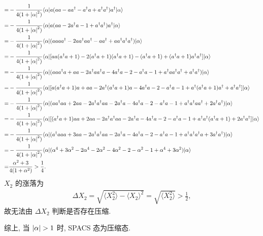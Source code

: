 \documentclass{assignment}
\begin{document}
\begin{sol}
\begin{align}
        \notag=&-\frac{1}{4(1+\left\lvert\alpha\right\rvert^2)}\langle\alpha\rvert a(aa-aa^{\dagger}-a^{\dagger}a+a^{\dagger}a^{\dagger})a^{\dagger}\lvert\alpha\rangle\\
        \notag=&-\frac{1}{4(1+\left\lvert\alpha\right\rvert^2)}\langle\alpha\rvert a(aa-2a^{\dagger}a-1+a^{\dagger}a^{\dagger})a^{\dagger}\lvert\alpha\rangle\\
        \notag=&-\frac{1}{4(1+\left\lvert\alpha\right\rvert^2)}\langle\alpha\rvert(aaaa^{\dagger}-2aa^{\dagger}aa^{\dagger}-aa^{\dagger}+aa^{\dagger}a^{\dagger}a^{\dagger})\lvert\alpha\rangle\\
        \notag=&-\frac{1}{4(1+\left\lvert\alpha\right\rvert^2)}\langle\alpha\rvert[aa(a^{\dagger}a+1)-2(a^{\dagger}a+1)(a^{\dagger}a+1)-(a^{\dagger}a+1)+(a^{\dagger}a+1)a^{\dagger}a^{\dagger}]\lvert\alpha\rangle\\
        \notag=&-\frac{1}{4(1+\left\lvert\alpha\right\rvert^2)}\langle\alpha\rvert(aaa^{\dagger}a+aa-2a^{\dagger}aa^{\dagger}a-4a^{\dagger}a-2-a^{\dagger}a-1+a^{\dagger}aa^{\dagger}a^{\dagger}+a^{\dagger}a^{\dagger})\lvert\alpha\rangle\\
        \notag=&-\frac{1}{4(1+\left\lvert\alpha\right\rvert^2)}\langle\alpha\rvert[a(a^{\dagger}a+1)a+aa-2a^{\dagger}(a^{\dagger}a+1)a-4a^{\dagger}a-2-a^{\dagger}a-1+a^{\dagger}(a^{\dagger}a+1)a^{\dagger}+a^{\dagger}a^{\dagger}]\lvert\alpha\rangle\\
        \notag=&-\frac{1}{4(1+\left\lvert\alpha\right\rvert^2)}\langle\alpha\rvert(aa^{\dagger}aa+2aa-2a^{\dagger}a^{\dagger}aa-2a^{\dagger}a-4a^{\dagger}a-2-a^{\dagger}a-1+a^{\dagger}a^{\dagger}aa^{\dagger}+2a^{\dagger}a^{\dagger})\lvert\alpha\rangle\\
        \notag=&-\frac{1}{4(1+\left\lvert\alpha\right\rvert^2)}\langle\alpha\rvert[(a^{\dagger}a+1)aa+2aa-2a^{\dagger}a^{\dagger}aa-2a^{\dagger}a-4a^{\dagger}a-2-a^{\dagger}a-1+a^{\dagger}a^{\dagger}(a^{\dagger}a+1)+2a^{\dagger}a^{\dagger}]\lvert\alpha\rangle\\
        \notag=&-\frac{1}{4(1+\left\lvert\alpha\right\rvert^2)}\langle\alpha\rvert(a^{\dagger}aaa+3aa-2a^{\dagger}a^{\dagger}aa-2a^{\dagger}a-4a^{\dagger}a-2-a^{\dagger}a-1+a^{\dagger}a^{\dagger}a^{\dagger}a+3a^{\dagger}a^{\dagger})\lvert\alpha\rangle\\
        \notag=&-\frac{1}{4(1+\left\lvert\alpha\right\rvert^2)}\langle\alpha\rvert(\alpha^4+3\alpha^2-2\alpha^4-2\alpha^2-4\alpha^2-2-\alpha^2-1+\alpha^4+3\alpha^2)\lvert\alpha\rangle\\
        \notag=&\frac{\alpha^2+3}{4(1+\alpha^2)}>\frac{1}{4}.
    \end{align}
    $X_2$ 的涨落为
    \begin{align}
        \Delta X_2=\sqrt{\langle X_2^2\rangle-\langle X_2\rangle^2}=\sqrt{\langle X_2^2\rangle}>\frac{1}{2},
    \end{align}
    故无法由 $\Delta X_2$ 判断是否存在压缩.

    综上, 当 $\left\lvert\alpha\right\rvert>1$ 时, SPACS 态为压缩态.
\end{sol}
\end{document}
